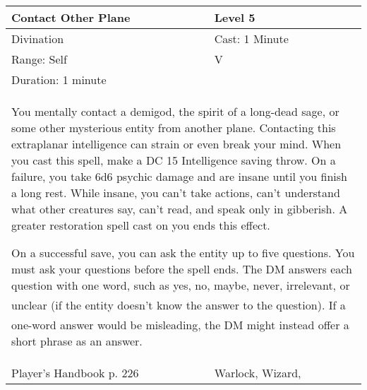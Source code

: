 \documentclass[11pt]{report}
\begin{document}
\begin{table}[H]
	\begin{tabular}{||p{6cm}|p{6cm}||}
		\hline\hline
		\bf{Contact Other Plane} & Level 5\\ \hline
		Divination & Cast: 1 Minute\\ \hline
		Range: Self & V\\ \hline
		Duration: 1 minute & \\ \hline
		\multicolumn{2}{||p{12cm}||}{You mentally contact a demigod, the spirit of a long-dead sage, or some other mysterious entity from another plane. 
Contacting this extraplanar intelligence can strain or even break your mind. When you cast this spell, make a DC 15 Intelligence saving throw. On a failure, you take 6d6 psychic damage and are insane until you finish a long rest. While insane, you can’t take actions, can’t understand what other creatures say, can’t read, and speak only in gibberish. A greater restoration spell cast on you ends this effect. 

On a successful save, you can ask the entity up to five questions. You must ask your questions before the spell ends. The DM answers each question with one word, such as yes, no, maybe, never, irrelevant, or unclear (if the entity doesn’t know the answer to the question). If a one-word answer would be misleading, the DM might instead offer a short phrase as an answer.}\\ \hline
Player's Handbook p. 226 & Warlock, Wizard, \\ \hline\hline
	\end{tabular}
\end{table}
\end{document}
